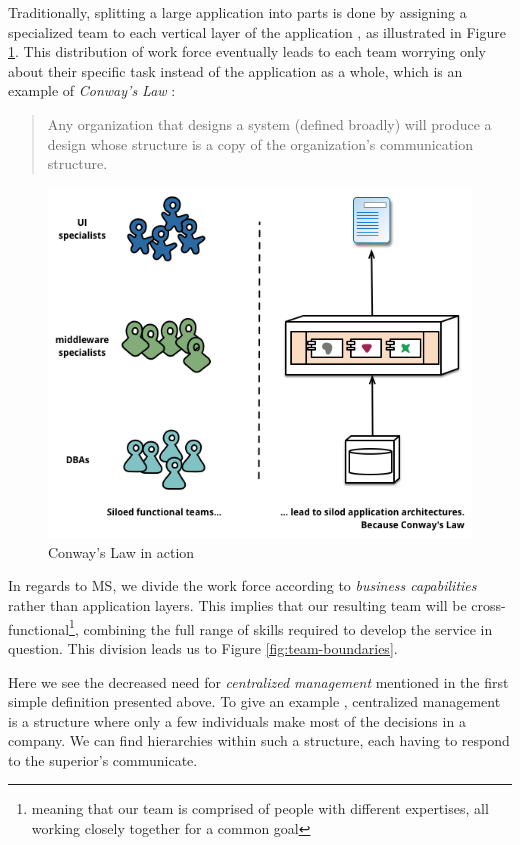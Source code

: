 Traditionally, splitting a large application into parts is done by
assigning a specialized team to each vertical layer of the application
\cite{ms-challenges}, as illustrated in Figure \ref{fig:conway}. This
distribution of work force eventually leads to each team worrying only
about their specific task instead of the application as a whole, which
is an example of \textit{Conway's Law} \cite{ms-definition}:  

\begin{quote}
	Any organization that designs a system (defined broadly) will
	produce a design whose structure is a copy of the organization's
	communication structure.  
\end{quote}

\begin{figure}
	\centering
	\includegraphics[width=\linewidth]{images/conways-law.png}
	\caption{Conway's Law in action \cite{ms-definition}}
	\label{fig:conway}
\end{figure}

In regards to MS, we divide the work force according to
\textit{business capabilities} rather than application layers. This
implies that our resulting team will be
cross-functional\footnote{meaning that our team is comprised of people
with different expertises, all working closely together for a common
goal}, combining the full range of skills required to develop the
service in question. This division leads us to Figure
\ref{fig:team-boundaries}.

Here we see the decreased need for \textit{centralized management}
mentioned in the first simple definition presented above. To give an
example \cite{central-decentral}, centralized management is a
structure where only a few individuals make most of the decisions in a
company. We can find hierarchies within such a structure, each having
to respond to the superior's communicate. 

